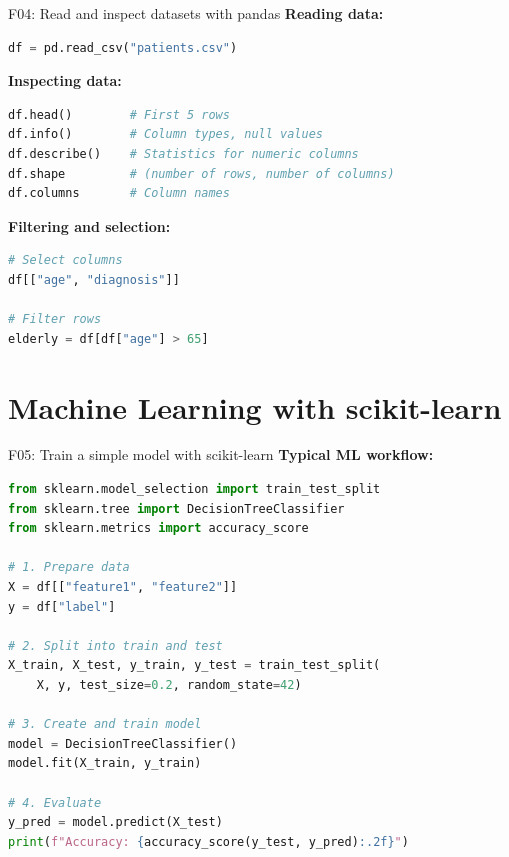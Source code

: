 \documentclass[aspectratio=169, 10pt]{beamer}
\begin{document}
\begin{frame}[fragile]{F04: Read and inspect datasets with pandas}
    \textbf{Reading data:}
    \begin{lstlisting}[language=Python]
df = pd.read_csv("patients.csv")
    \end{lstlisting}
    
    \textbf{Inspecting data:}
    \begin{lstlisting}[language=Python]
df.head()        # First 5 rows
df.info()        # Column types, null values
df.describe()    # Statistics for numeric columns
df.shape         # (number of rows, number of columns)
df.columns       # Column names
    \end{lstlisting}
    
    \textbf{Filtering and selection:}
    \begin{lstlisting}[language=Python]
# Select columns
df[["age", "diagnosis"]]

# Filter rows
elderly = df[df["age"] > 65]
    \end{lstlisting}
\end{frame}

\section{Machine Learning with scikit-learn}

\begin{frame}[fragile]{F05: Train a simple model with scikit-learn}
    \textbf{Typical ML workflow:}
    \begin{lstlisting}[language=Python]
from sklearn.model_selection import train_test_split
from sklearn.tree import DecisionTreeClassifier
from sklearn.metrics import accuracy_score

# 1. Prepare data
X = df[["feature1", "feature2"]]
y = df["label"]

# 2. Split into train and test
X_train, X_test, y_train, y_test = train_test_split(
    X, y, test_size=0.2, random_state=42)

# 3. Create and train model
model = DecisionTreeClassifier()
model.fit(X_train, y_train)

# 4. Evaluate
y_pred = model.predict(X_test)
print(f"Accuracy: {accuracy_score(y_test, y_pred):.2f}")
    \end{lstlisting}
\end{frame}
\end{document}
